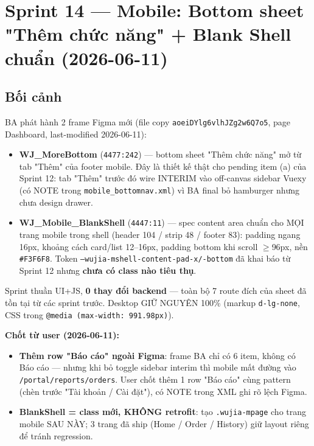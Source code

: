 \chapter{Sprint 14 --- Mobile: Bottom sheet "Thêm chức năng" + Blank Shell chuẩn (2026-06-11)}

\section{Bối cảnh}

BA phát hành 2 frame Figma mới (file copy \texttt{aoeiDYlg6vlhJZg2w6Q7o5}, page
Dashboard, last-modified 2026-06-11):

\begin{itemize}
  \item \textbf{WJ\_MoreBottom} (\texttt{4477:242}) --- bottom sheet "Thêm chức năng"
        mở từ tab "Thêm" của footer mobile. Đây là thiết kế thật cho pending item (a)
        của Sprint 12: tab "Thêm" trước đó wire INTERIM vào off-canvas sidebar Vuexy
        (có NOTE trong \texttt{mobile\_bottomnav.xml}) vì BA final bỏ hamburger nhưng
        chưa design drawer.
  \item \textbf{WJ\_Mobile\_BlankShell} (\texttt{4447:11}) --- spec content area chuẩn
        cho MỌI trang mobile trong shell (header 104 / strip 48 / footer 83): padding
        ngang 16px, khoảng cách card/list 12--16px, padding bottom khi scroll
        \(\geq\)96px, nền \texttt{\#F3F6F8}. Token \texttt{--wujia-mshell-content-pad-x/-bottom}
        đã khai báo từ Sprint 12 nhưng \textbf{chưa có class nào tiêu thụ}.
\end{itemize}

Sprint thuần UI+JS, \textbf{0 thay đổi backend} --- toàn bộ 7 route đích của sheet đã
tồn tại từ các sprint trước. Desktop GIỮ NGUYÊN 100\% (markup \texttt{d-lg-none}, CSS
trong \texttt{@media (max-width: 991.98px)}).

\textbf{Chốt từ user (2026-06-11):}
\begin{itemize}
  \item \textbf{Thêm row "Báo cáo" ngoài Figma}: frame BA chỉ có 6 item, không có
        Báo cáo --- nhưng khi bỏ toggle sidebar interim thì mobile mất đường vào
        \texttt{/portal/reports/orders}. User chốt thêm 1 row "Báo cáo" cùng pattern
        (chèn trước "Tài khoản / Cài đặt"), có NOTE trong XML ghi rõ lệch Figma.
  \item \textbf{BlankShell = class mới, KHÔNG retrofit}: tạo \texttt{.wujia-mpage}
        cho trang mobile SAU NÀY; 3 trang đã ship (Home / Order / History) giữ layout
        riêng để tránh regression.
\end{itemize}

